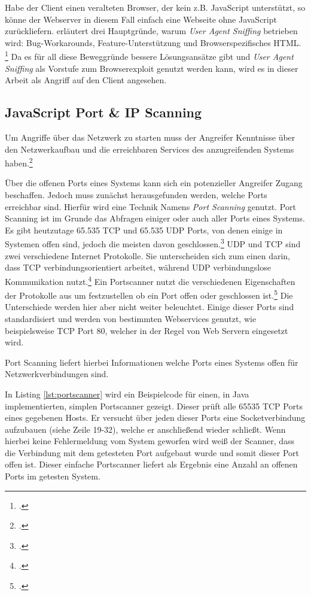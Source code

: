Habe der Client einen veralteten Browser, der kein z.B. JavaScript unterstützt, so könne der Webserver in diesem Fall einfach eine Webseite ohne JavaScript zurückliefern.
\cite{mdnBrowserDetection} erläutert drei Hauptgründe, warum \textit{User Agent Sniffing} betrieben wird: Bug-Workarounds, Feature-Unterstützung und Browserspezifisches HTML.
\footcite[Vgl.][]{mdnBrowserDetection}
Da es für all diese Beweggründe bessere Lösungsansätze gibt und \textit{User Agent Sniffing} als Vorstufe zum Browserexploit genutzt werden kann, wird es in dieser Arbeit als Angriff auf den Client angesehen.


\subsection{JavaScript Port \& IP Scanning}
Um Angriffe über das Netzwerk zu starten muss der Angreifer Kenntnisse über den Netzwerkaufbau und die erreichbaren Services des anzugreifenden Systems haben.\footcite[Vgl.][937]{port1}

Über die offenen Ports eines Systems kann sich ein potenzieller Angreifer Zugang beschaffen. Jedoch muss zunächst herausgefunden werden, welche Ports erreichbar sind. Hierfür wird eine Technik Namens \textit{Port Scanning} genutzt. Port Scanning ist im Grunde das Abfragen einiger oder auch aller Ports eines Systems. Es gibt heutzutage 65.535 TCP und 65.535 UDP Ports, von denen einige in Systemen offen sind, jedoch die meisten davon geschlossen.\footcite[Vgl.][937]{port1} UDP und TCP sind zwei verschiedene Internet Protokolle. Sie unterscheiden sich zum einen darin, dass TCP verbindungsorientiert arbeitet, während UDP verbindungslose Kommunikation nutzt.\footcite[Vgl.][]{tcpudp} Ein Portscanner nutzt die verschiedenen Eigenschaften der Protokolle aus um festzustellen ob ein Port offen oder geschlossen ist.\footcite[Vgl.][31]{port2} Die Unterschiede werden hier aber nicht weiter beleuchtet. Einige dieser Ports sind standardisiert und werden von bestimmten Webservices genutzt, wie beispielsweise TCP Port 80, welcher in der Regel von Web Servern eingesetzt wird.

Port Scanning liefert hierbei Informationen welche Ports eines Systems offen für Netzwerkverbindungen sind.

In Listing \ref{lst:portscanner} wird ein Beispielcode für einen, in Java implementierten, simplen Portscanner gezeigt. Dieser prüft alle 65535 TCP Ports eines gegebenen Hosts. Er versucht über jeden dieser Ports eine Socketverbindung aufzubauen (siehe Zeile 19-32), welche er anschließend wieder schließt. Wenn hierbei keine Fehlermeldung vom System geworfen wird weiß der Scanner, dass die Verbindung mit dem getesteten Port aufgebaut wurde und somit dieser Port offen ist. Dieser einfache Portscanner liefert als Ergebnis eine Anzahl an offenen Ports im getesten System.

